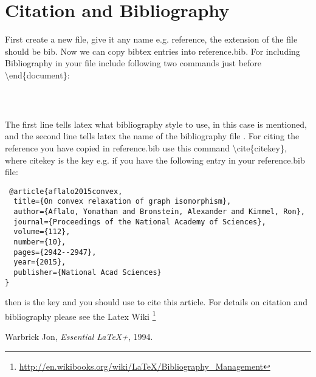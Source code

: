 \section{Citation and Bibliography}
First create a new file, give it any name e.g. reference, the extension of the file should be bib. Now we can copy bibtex entries into reference.bib. For including Bibliography in your file include following two commands just before \textbackslash end\{document\}:
\begin{lstlisting}
  
  
\end{lstlisting}
The first line tells latex what bibliography style to use, in this case  is mentioned, and the second line tells latex the name of the bibliography file . For citing the reference you have copied in reference.bib use this command \textbackslash cite\{citekey\}, where citekey is the key e.g. if you have the following entry in your reference.bib file:
\begin{lstlisting}
 @article{aflalo2015convex,
  title={On convex relaxation of graph isomorphism},
  author={Aflalo, Yonathan and Bronstein, Alexander and Kimmel, Ron},
  journal={Proceedings of the National Academy of Sciences},
  volume={112},
  number={10},
  pages={2942--2947},
  year={2015},
  publisher={National Acad Sciences}
}
\end{lstlisting}
then  is the key and you should use  to cite this article.
For details on citation and bibliography please see the Latex Wiki \footnote{\url{http://en.wikibooks.org/wiki/LaTeX/Bibliography_Management}}

\begin{thebibliography}{9}
 Warbrick Jon,
 \emph{Essential \LaTeX+},
 1994.

\end{thebibliography}